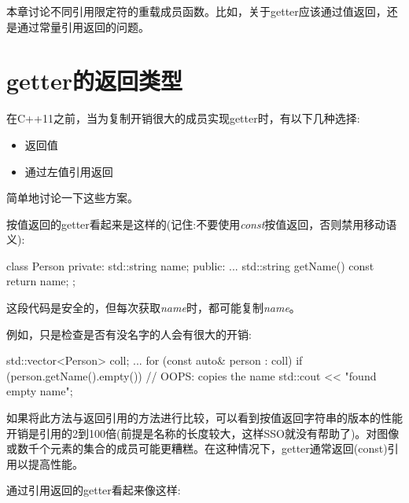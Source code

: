 
本章讨论不同引用限定符的重载成员函数。比如，关于getter应该通过值返回，还是通过常量引用返回的问题。\par


\section{getter的返回类型}

在C++11之前，当为复制开销很大的成员实现getter时，有以下几种选择:\par

\begin{itemize}
  \item 返回值
  \item 通过左值引用返回
\end{itemize}

简单地讨论一下这些方案。\par


按值返回的getter看起来是这样的(记住:不要使用\textit{const}按值返回，否则禁用移动语义):\par

\begin{codebox}[cpp]
class Person
{
private:
  std::string name;
public:
  ...
  std::string getName() const {
    return name;
  }
};
\end{codebox}

这段代码是安全的，但每次获取\textit{name}时，都可能复制\textit{name}。\par

例如，只是检查是否有没名字的人会有很大的开销:\par

\begin{codebox}[cpp]
std::vector<Person> coll;
...
for (const auto& person : coll) {
  if (person.getName().empty()) { // OOPS: copies the name
    std::cout << "found empty name\n";
  }
}
\end{codebox}

如果将此方法与返回引用的方法进行比较，可以看到按值返回字符串的版本的性能开销是引用的2到100倍(前提是名称的长度较大，这样SSO就没有帮助了)。对图像或数千个元素的集合的成员可能更糟糕。在这种情况下，getter通常返回(const)引用以提高性能。\par


通过引用返回的getter看起来像这样:\par

